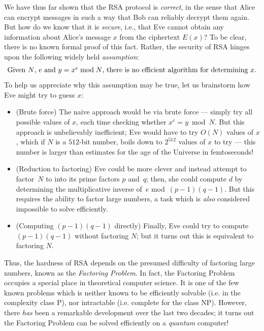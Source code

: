 \documentclass[11pt]{article}
\newcounter{thm}
\begin{document}
We have thus far shown that the RSA protocol is {\it correct}, in the sense that Alice can encrypt messages in such a way that Bob can reliably decrypt them again.  But how do we know that it is {\it secure}, i.e., that Eve cannot obtain any information about Alice's message $x$ from the ciphertext $E(x)$? To be clear, there is no known formal proof of this fact. Rather, the security of RSA hinges upon the following widely held \emph{assumption}:
\[
\hbox{\rm Given $N$, $e$ and $y=x^e\bmod N$, there is no efficient algorithm for
determining~$x$.}
\]
To help us appreciate why this assumption may be true, let us brainstorm how Eve might try to guess $x$: 
\begin{itemize}
    \item (Brute force) The naive approach would be via brute force --- simply try all possible values of $x$, each time checking whether $x^e=y\bmod N$. But this approach is unbelievably inefficient; Eve would have to try $O(N)$ values of $x$, which if $N$ is a $512$-bit number, boils down to $2^{512}$ values of $x$ to try --- this number is larger than estimates for the age of the Universe in femtoseconds!       
    \item (Reduction to factoring) Eve could be more clever and instead attempt to factor~$N$ to into its prime factors $p$ and~$q$; then, she could compute $d$ by determining the multiplicative inverse of~$e$ mod~$(p-1)(q-1)$. But this requires the ability to factor large numbers, a task which is \emph{also} considered impossible to solve efficiently.
        
    \item (Computing $(p-1)(q-1)$ directly) Finally, Eve could try to compute  $(p-1)(q-1)$ without factoring $N$; but it turns out this is equivalent to factoring $N$.
\end{itemize}

Thus, the hardness of RSA depends on the presumed difficulty of factoring large numbers, known as the \emph{Factoring Problem}. In fact, the Factoring Problem occupies a special place in theoretical computer science. It is one of the few known problems which is neither known to be efficiently solvable (i.e. in the complexity class P), nor intractable (i.e. complete for the class NP). However, there \emph{has} been a remarkable development over the last two decades; it turns out the Factoring Problem can be solved efficiently on a \emph{quantum} computer!

\end{document}
